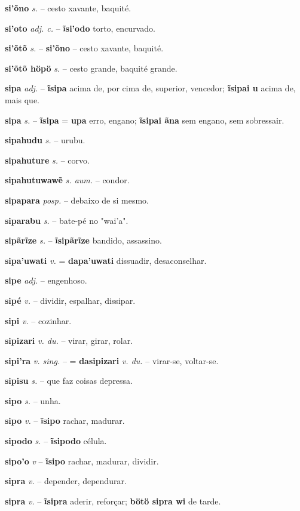 \textbf{si'õno} \textit{s.} -- cesto xavante, baquité.

\textbf{si'oto} \textit{adj. c.} -- \textbf{ĩsi'odo} torto, encurvado.

\textbf{si'õtõ} \textit{s.} -- \textbf{si'õno} -- cesto xavante, baquité.

\textbf{si'õtõ höpö} \textit{s.} -- cesto grande, baquité grande.

\textbf{sipa} \textit{adj.} -- \textbf{ĩsipa} acima de, por cima de, superior, vencedor; \textbf{ĩsipai u} acima de, mais que.

\textbf{sipa} \textit{s.} -- \textbf{ĩsipa} = \textbf{upa} erro, engano; \textbf{ĩsipai ãna} sem engano, sem sobressair.

\textbf{sipahudu} \textit{s.} -- urubu.

\textbf{sipahuture} \textit{s.} -- corvo.

\textbf{sipahutuwawẽ} \textit{s. aum.} -- condor.

\textbf{sipapara} \textit{posp.} -- debaixo de si mesmo.

\textbf{siparabu} \textit{s.} -- bate-pé no "wai'a".

\textbf{sipãrĩze} \textit{s.} -- \textbf{ĩsipãrĩze} bandido, assassino.

\textbf{sipa'uwati} \textit{v.} = \textbf{dapa'uwati} dissuadir, desaconselhar.

\textbf{sipe} \textit{adj.} -- engenhoso.

\textbf{sipé} \textit{v.} -- dividir, espalhar, dissipar.

\textbf{sipi} \textit{v.} -- cozinhar.

\textbf{sipizari} \textit{v. du.} -- virar, girar, rolar.

\textbf{sipi'ra} \textit{v. sing.} -- = \textbf{dasipizari} \textit{v. du.} -- virar-se, voltar-se.

\textbf{sipisu} \textit{s.} -- que faz coisas depressa.

\textbf{sipo} \textit{s.} -- unha.

\textbf{sipo} \textit{v.} -- \textbf{ĩsipo} rachar, madurar.

\textbf{sipodo} \textit{s.} -- \textbf{ĩsipodo} célula.

\textbf{sipo'o} \textit{v} -- \textbf{ĩsipo} rachar, madurar, dividir.

\textbf{sipra} \textit{v.} -- depender, dependurar.

\textbf{sipra} \textit{v.} -- \textbf{ĩsipra} aderir, reforçar; \textbf{bötö sipra wi} de tarde.

